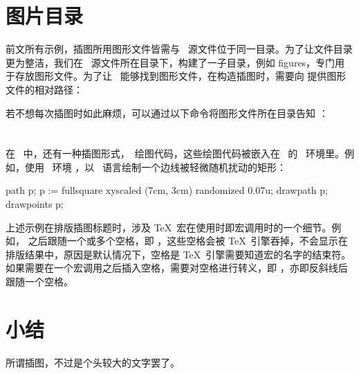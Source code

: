 \starttyping[option=TEX]
\stoptyping
{}

\section{图片目录}

前文所有示例，插图所用图形文件皆需与 \ConTeXt\ 源文件位于同一目录。为了让文件目录更为整洁，我们在 \ConTeXt\ 源文件所在目录下，构建了一子目录，例如 figures，专门用于存放图形文件。为了让 \ConTeXt\ 能够找到图形文件，在构造插图时，需要向 \type{\externalfigure} 提供图形文件的相对路径：

\starttyping[option=TEX]
\stoptyping

若不想每次插图时如此麻烦，可以通过以下命令将图形文件所在目录告知 \ConTeXt：

\starttyping[option=TEX]
\setupexternalfigures[directory={./figures}]
\stoptyping

\section{\MetaFun}

在 \ConTeXt\ 中，还有一种插图形式，\METAPOST\ 绘图代码，这些绘图代码被嵌入在 \ConTeXt\ 的 \MetaFun\ 环境里。例如，使用 \MetaFun\ 环境 ，以 \METAPOST\ 语言绘制一个边线被轻微随机扰动的矩形：

\starttyping[option=TEX]
path p; p := fullsquare xyscaled (7cm, 3cm) randomized 0.07u;
drawpath p; drawpoints p;
\stopuseMPgraphic
{}
\stoptyping
{}

上述示例在排版插图标题时，涉及 \TeX\ 宏在使用时即宏调用时的一个细节。例如，\type{\TeX} 之后跟随一个或多个空格，即 \type[space=on]{\TeX    }，这些空格会被 \TeX\ 引擎吞掉，不会显示在排版结果中，原因是默认情况下，空格是 \TeX\ 引擎需要知道宏的名字的结束符。如果需要在一个宏调用之后插入空格，需要对空格进行转义，即 \type[space=on]{\ }，亦即反斜线后跟随一个空格。

\section{小结}

所谓插图，不过是个头较大的文字罢了。

